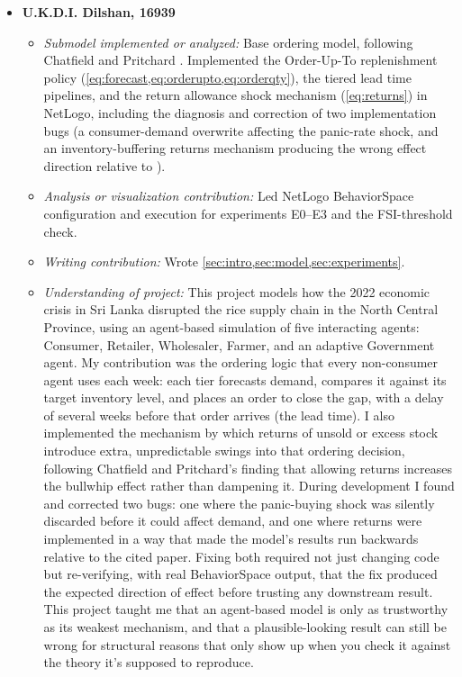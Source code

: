 \documentclass[final,onefignum,onetabnum]{siuro250211}
\begin{document}
\begin{itemize}[leftmargin=.3in]

\item[] \textbf{U.K.D.I. Dilshan, 16939}
\begin{itemize}
\item \textit{Submodel implemented or analyzed:} Base ordering model, following Chatfield and
Pritchard \cite{ChatfieldPritchard2013}. Implemented the Order-Up-To replenishment policy
(\cref{eq:forecast,eq:orderupto,eq:orderqty}), the tiered lead time pipelines, and the return
allowance shock mechanism (\cref{eq:returns}) in NetLogo, including the diagnosis and correction of
two implementation bugs (a consumer-demand overwrite affecting the panic-rate shock, and an
inventory-buffering returns mechanism producing the wrong effect direction relative to
\cite{ChatfieldPritchard2013}).
\item \textit{Analysis or visualization contribution:} Led NetLogo BehaviorSpace configuration and
execution for experiments E0--E3 and the FSI-threshold check.
\item \textit{Writing contribution:} Wrote \cref{sec:intro,sec:model,sec:experiments}.
\item \textit{Understanding of project:} This project models how the 2022 economic crisis in Sri
Lanka disrupted the rice supply chain in the North Central Province, using an agent-based
simulation of five interacting agents: Consumer, Retailer, Wholesaler, Farmer, and an adaptive
Government agent. My contribution was the ordering logic that every non-consumer agent uses each
week: each tier forecasts demand, compares it against its target inventory level, and places an
order to close the gap, with a delay of several weeks before that order arrives (the lead time).
I also implemented the mechanism by which returns of unsold or excess stock introduce extra,
unpredictable swings into that ordering decision, following Chatfield and Pritchard's finding that
allowing returns increases the bullwhip effect rather than dampening it. During development I
found and corrected two bugs: one where the panic-buying shock was silently discarded before it
could affect demand, and one where returns were implemented in a way that made the model's results
run backwards relative to the cited paper. Fixing both required not just changing code but
re-verifying, with real BehaviorSpace output, that the fix produced the expected direction of
effect before trusting any downstream result. This project taught me that an agent-based model is
only as trustworthy as its weakest mechanism, and that a plausible-looking result can still be
wrong for structural reasons that only show up when you check it against the theory it's supposed
to reproduce.
\end{itemize}


\end{itemize}
\end{document}
